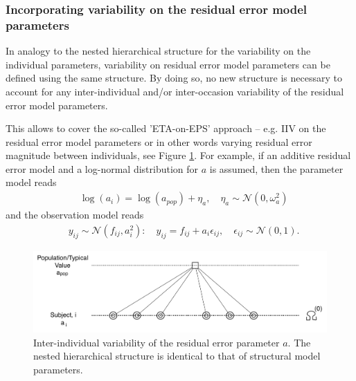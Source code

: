 \subsubsection{Incorporating variability on the residual error model parameters}
\label{subsec:varModelResidualError}
In analogy to the nested hierarchical structure for the variability on the individual parameters,
variability on residual error model parameters can be defined using the same structure.
By doing so, no new structure is necessary to account for any inter-individual and/or inter-occasion variability of the residual error model parameters.

This allows \pharmml to cover the so-called 'ETA-on-EPS' approach -- e.g. IIV on the residual error model parameters or in other words varying residual
error magnitude between individuals, see Figure \ref{fig:IOV0_residualError}.
For example, if an additive residual error model and a log-normal distribution for $a$ is assumed, then the parameter model reads
\begin{align*}
	& \log(a_i) = \log(a_{pop}) + \eta_a, \quad  \eta_a \sim \mathcal{N}(0,\omega_a^2)
\end{align*}
and the observation model reads
\begin{align*}
	& y_{ij} \sim \mathcal{N}(f_{ij},a_i^2): \quad y_{ij} = f_{ij} + a_i \epsilon_{ij}, \quad \epsilon_{ij} \sim \mathcal{N}(0,1).
\end{align*}
\begin{figure}[htb!]
\centering
  \includegraphics[width=130mm]{pics/IOV0}
 \caption{Inter-individual variability of the residual error parameter $a$. The nested hierarchical structure is identical to that of structural model parameters.}
 \label{fig:IOV0_residualError}
\end{figure}


